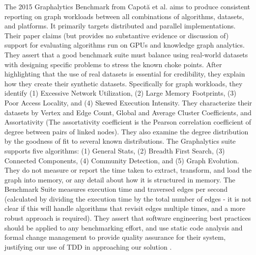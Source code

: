 \par{The 2015 Graphalytics Benchmark from Capot{\u{a}} et al. aims to produce consistent reporting on graph workloads between all combinations of algorithms, datasets, and platforms. 
It primarily targets distributed and parallel implementations. 
Their paper claims (but provides no substantive evidence or discussion of) support for evaluating algorithms run on GPUs and knowledge graph analytics. 
They assert that a good benchmark suite must balance using real-world datasets with designing specific problems to stress the known choke points. 
After highlighting that the use of real datasets is essential for credibility, they explain how they create their synthetic datasets.
Specifically for graph workloads, they identify (1) Excessive Network Utilization, (2) Large Memory Footprints, (3) Poor Access Locality, and (4) Skewed Execution Intensity. 
They characterize their datasets by Vertex and Edge Count, Global and Average Cluster Coefficients, and Assortativity (The assortativity coefficient is the Pearson correlation coefficient of degree between pairs of linked nodes). 
They also examine the degree distribution by the goodness of fit to several known distributions. 
The Graphalytics suite supports five algorithms: (1) General Stats, (2) Breadth First Search, (3) Connected Components, (4) Community Detection, and (5) Graph Evolution. 
They do not measure or report the time taken to extract, transform, and load the graph into memory, or any detail about how it is structured in memory. 
The Benchmark Suite measures execution time and traversed edges per second (calculated by dividing the execution time by the total number of edges - it is not clear if this will handle algorithms that revisit edges multiple times, and a more robust approach is required). 
They assert that software engineering best practices should be applied to any benchmarking effort, and use static code analysis and formal change management to provide quality assurance for their system, justifying our use of TDD in approaching our solution \cite{Capota2015}.}

\par{ }

